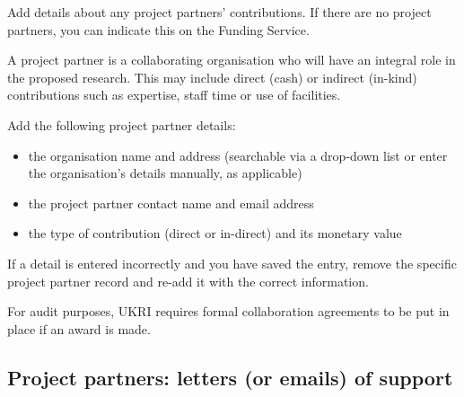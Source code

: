 \documentclass[12in]{article}
\begin{document}
{\color{red}

Add details about any project partners’ contributions. If there are no project
partners, you can indicate this on the Funding Service.

A project partner is a collaborating organisation who will have an integral role in
the proposed research. This may include direct (cash) or indirect (in-kind)
contributions such as expertise, staff time or use of facilities.

Add the following project partner details:

\begin{itemize}

	\item the organisation name and address (searchable via a drop-down list or enter
the organisation’s details manually, as applicable)

	\item the project partner contact name and email address

	\item the type of contribution (direct or in-direct) and its monetary value

\end{itemize}

If a detail is entered incorrectly and you have saved the entry, remove the
specific project partner record and re-add it with the correct information.

For audit purposes, UKRI requires formal collaboration agreements to be put in
place if an award is made.

}

\pagebreak

\subsection{Project partners: letters (or emails) of support}
\end{document}
